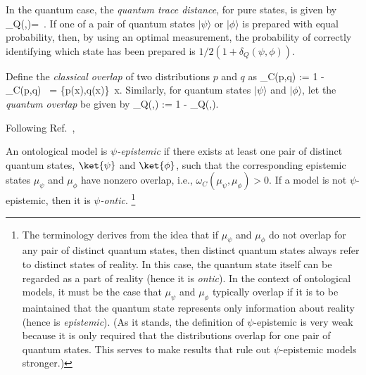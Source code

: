 In the quantum case, the \emph{quantum trace distance}, for pure states, is given by
\be\label{eq:quantum_trace}
\delta_Q(\psi,\phi)= \,.
\ee
If one of a pair of quantum states $|\psi\rangle$ or $|\phi\rangle$ is prepared with equal probability, then, by using an optimal measurement, the probability of correctly identifying which state has been prepared is $1/2(1+\delta_Q(\psi,\phi))$. 

Define the {\it classical overlap} of two distributions $p$ and $q$ as
\be
\omega_C(p,q) := 1 - \delta_C(p,q) \, = \int \min \{p(x),q(x)\} \,x.
\ee
Similarly, for quantum states $|\psi\rangle$ and $|\phi\rangle$, let the \emph{quantum overlap} be given by
\be
\omega_Q(\psi,\phi) := 1 - \delta_Q(\psi,\phi).
\ee

Following Ref.~\cite{Harrigan2010}, 
\begin{dfn}
An ontological model is  \emph{$\psi$-epistemic} if there exists at least one pair of distinct quantum states, $\ket{\psi}$ and $\ket{\phi}$, such that the corresponding epistemic states $\mu_\psi$ and $\mu_\phi$ have nonzero overlap, i.e., $\omega_C(\mu_\psi,\mu_\phi) > 0$. If a model is not $\psi$-epistemic, then it is \emph{$\psi$-ontic}. \footnote{The terminology derives from the idea that if $\mu_\psi$ and $\mu_\phi$ do not overlap for any pair of distinct quantum states, then distinct quantum states always refer to distinct states of reality. In this case, the quantum state itself can be regarded as a part of reality (hence it is \emph{ontic}). In the context of ontological models, it must be the case that $\mu_\psi$ and $\mu_\phi$ typically overlap if it is to be maintained that the quantum state represents only information about reality (hence is \emph{epistemic}). (As it stands, the definition of $\psi$-epistemic is very weak because it is only required that the distributions overlap for one pair of quantum states. This serves to make results that rule out $\psi$-epistemic models stronger.)}
\end{dfn}

